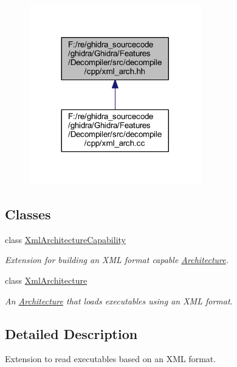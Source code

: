 \begin{figure}[H]
\begin{center}
\leavevmode
\includegraphics[width=212pt]{xml__arch_8hh__dep__incl}
\end{center}
\end{figure}
\subsection*{Classes}
\begin{DoxyCompactItemize}
\item 
class \mbox{\hyperlink{class_xml_architecture_capability}{Xml\+Architecture\+Capability}}
\begin{DoxyCompactList}\small\item\em Extension for building an X\+ML format capable \mbox{\hyperlink{class_architecture}{Architecture}}. \end{DoxyCompactList}\item 
class \mbox{\hyperlink{class_xml_architecture}{Xml\+Architecture}}
\begin{DoxyCompactList}\small\item\em An \mbox{\hyperlink{class_architecture}{Architecture}} that loads executables using an X\+ML format. \end{DoxyCompactList}\end{DoxyCompactItemize}


\subsection{Detailed Description}
Extension to read executables based on an X\+ML format. 

